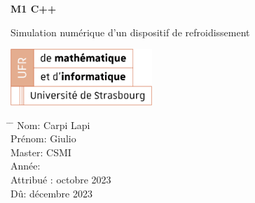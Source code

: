 \documentclass[12pt,a4paper]{article}
\title{}
\author{}
\date{}
\begin{document}
	
	\newcommand{\subf}[2]{%
		{\small\begin{tabular}[t]{@{}c@{}}
				#1\\#2
		\end{tabular}}%
	}
	
	\begin{titlepage}
		\begin{center}
			\vspace*{3cm}
			
			\Huge
			\textbf{M1 C++}
			
			\vspace{0.3cm}
			\Huge
			Simulation numérique d'un dispositif de refroidissement
			
			\vspace{0.8cm}
			\large
			
			
			
			\vspace{0.5cm}
			\LARGE
			
			
			\vspace{1.5cm}
			
			\textbf{}
            \includegraphics[width=0.4\textwidth]{logo_ufr.png}
			
			\vfill
			
			
			
			\vspace{0.8cm}
			
			
			
			\Large
			
			
			
			
		\end{center}
		\Large
		\begin{tabbing}
			\hspace*{1em}\= \hspace*{8em} \= \kill %
			\> Nom:\>  Carpi Lapi \\
			\> Prénom:\>  Giulio \\
			\> Master:\>  CSMI  \\
			\> Année:  \> 2023 \\
			\> Attribué :  octobre 2023\\
			\> Dû:  décembre 2023
		\end{tabbing}
		
	\end{titlepage}
	
\end{document}
